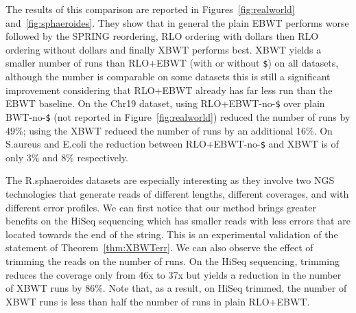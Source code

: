 

The results of this comparison are reported in Figures~\ref{fig:realworld} and~\ref{fig:sphaeroides}. They show that in general the plain EBWT performs worse followed by the SPRING reordering, RLO ordering with dollars then RLO ordering without dollars and finally XBWT performs best.  XBWT yields a smaller number of runs than RLO+EBWT (with or without \texttt{\$}) on all datasets, although the number is comparable on some datasets this is still a significant improvement considering that RLO+EBWT already has far less run than the EBWT baseline. On the Chr19 dataset, using RLO+EBWT-no-\texttt{\$} over plain BWT-no-\texttt{\$} (not reported in Figure~\ref{fig:realworld}) reduced the number of runs by 49\%; using the XBWT reduced the number of runs by an additional 16\%. On S.aureus and E.coli the reduction between RLO+EBWT-no-\texttt{\$} and XBWT is of only 3\% and 8\% respectively. 

The R.sphaeroides datasets are especially interesting as they involve two NGS technologies that generate reads of different lengths, different coverages, and with different error profiles. We can first notice that our method brings greater benefits on the HiSeq sequencing which has smaller reads with less errors that are located towards the end of the string. This is an experimental validation of the statement of Theorem~\ref{thm:XBWTerr}. We can also observe the effect of trimming the reads on the number of runs. On the HiSeq sequencing, trimming reduces the coverage only from 46x to 37x but yields a reduction in the number of XBWT runs by 86\%. Note that, as a result, on HiSeq trimmed, the number of XBWT runs is less than half the number of runs in plain RLO+EBWT. 





